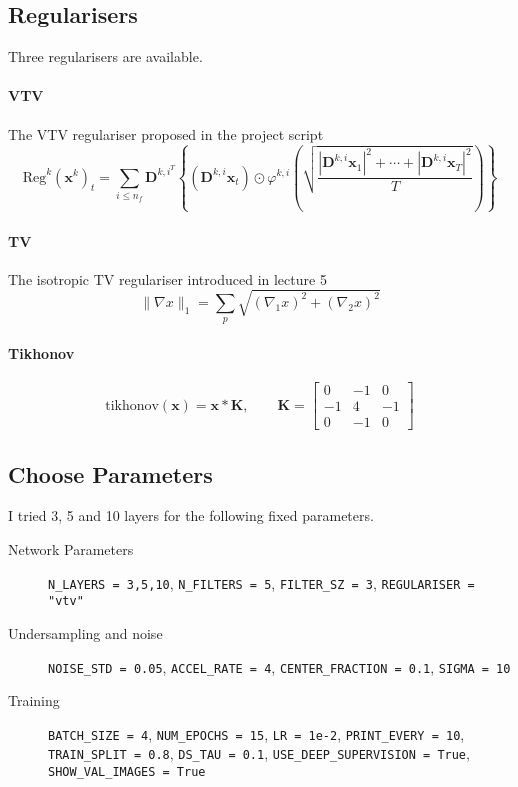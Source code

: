 \subsection{Regularisers}

Three regularisers are available.

\paragraph{VTV}
The VTV regulariser proposed in the project script
\[
\text{Reg}^k(\mathbf{x}^k)_t = \sum_{i \le n_f} \mathbf{D}^{k,i^T} \left\{ (\mathbf{D}^{k,i}\mathbf{x}_t) \odot \varphi^{k,i} \left( \sqrt{\frac{|\mathbf{D}^{k,i}\mathbf{x}_1|^2 + \cdots + |\mathbf{D}^{k,i}\mathbf{x}_T|^2}{T}} \right) \right\}
\]

\paragraph{TV}
The isotropic TV regulariser introduced in lecture 5
\[
\|\nabla x\|_1 = \sum_p \sqrt{(\nabla_1x)^2 + (\nabla_2x)^2}
\]

\paragraph{Tikhonov}
\[
\text{tikhonov}(\mathbf{x}) = \mathbf{x} * \mathbf{K}, \qquad \mathbf{K} = \begin{bmatrix} 0 & -1 & 0 \\ -1 & 4 & -1 \\ 0 & -1 & 0 \end{bmatrix}
\]

\subsection{Choose Parameters}

I tried 3, 5 and 10 layers for the following fixed parameters.

\begin{description}
  \item[Network Parameters] \verb|N_LAYERS = 3,5,10|, \verb|N_FILTERS = 5|, \verb|FILTER_SZ = 3|, \verb|REGULARISER = "vtv"|
  \item[Undersampling and noise] \verb|NOISE_STD = 0.05|, \verb|ACCEL_RATE = 4|, \verb|CENTER_FRACTION = 0.1|, \verb|SIGMA = 10|
  \item[Training] \verb|BATCH_SIZE = 4|, \verb|NUM_EPOCHS = 15|, \verb|LR = 1e-2|, \verb|PRINT_EVERY = 10|, \verb|TRAIN_SPLIT = 0.8|, \verb|DS_TAU = 0.1|, \verb|USE_DEEP_SUPERVISION = True|, \verb|SHOW_VAL_IMAGES = True|
\end{description}

